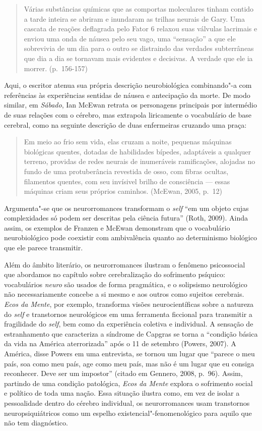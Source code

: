 \begin{quote}
Várias substâncias químicas que as comportas moleculares tinham contido
a tarde inteira se abriram e inundaram as trilhas neurais de Gary. Uma
cascata de reações deflagrada pelo Fator 6 relaxou suas válvulas
lacrimais e enviou uma onda de náusea pelo seu vago, uma ``sensação'' a
que ele sobrevivia de um dia para o outro se distraindo das verdades
subterrâneas que dia a dia se tornavam mais evidentes e decisivas. A
verdade que ele ia morrer. (p.~156-157)
\end{quote}

Aqui, o escritor atenua sua própria descrição neurobiológica
combinando"-a com referências às experiências sentidas de náusea e
antecipação da morte. De modo similar, em \emph{Sábado}, Ian McEwan
retrata os personagens principais por intermédio de suas relações com o
cérebro, mas extrapola liricamente o vocabulário de base cerebral, como
na seguinte descrição de duas enfermeiras cruzando uma praça:

\begin{quote}
Em meio ao frio sem vida, elas cruzam a noite, pequenas máquinas
biológicas quentes, dotadas de habilidades bípedes, adaptáveis a
qualquer terreno, providas de redes neurais de inumeráveis ramificações,
alojadas no fundo de uma protuberância revestida de osso, com fibras
ocultas, filamentos quentes, com seu invísivel brilho de consciência ---
essas máquinas criam seus próprios caminhos. (McEwan, 2005, p.~12)
\end{quote}

Argumenta"-se que os neurorromances transformam o \emph{self} ``em um objeto
cujas complexidades só podem ser descritas pela ciência futura'' (Roth,
2009). Ainda assim, os exemplos de Franzen e McEwan demonstram que o
vocabulário neurobiológico pode coexistir com ambivalência quanto ao
determinismo biológico que ele parece transmitir.

Além do âmbito literário, os neurorromances ilustram o fenômeno
psicossocial que abordamos no capítulo sobre cerebralização do
sofrimento psíquico: vocabulários \emph{neuro} são usados de forma
pragmática, e o solipsismo neurológico não necessariamente concebe a si
mesmo e aos outros como sujeitos cerebrais. \emph{Ecos da Mente}, por
exemplo, transforma visões neurocientíficas sobre a natureza do \emph{self} e
transtornos neurológicos em uma ferramenta ficcional para transmitir a
fragilidade do \emph{self}, bem como da experiência coletiva e individual. A
sensação de estranhamento que caracteriza a síndrome de Capgras se torna
a ``condição básica da vida na América aterrorizada'' após o 11 de
setembro (Powers, 2007). A América, disse Powers em uma entrevista, se
tornou um lugar que ``parece o meu país, soa como meu país, age como meu
país, mas não é um lugar que eu consiga reconhecer. Deve ser um
impostor'' (citado em Gennero, 2008, p.~96). Assim, partindo de uma
condição patológica, \emph{Ecos da Mente} explora o sofrimento social e
político de toda uma nação. Essa situação ilustra como, em vez de isolar
a pessoalidade dentro do cérebro individual, os neurorromances usam
transtornos neuropsiquiátricos como um espelho
existencial"-fenomenológico para aquilo que não tem diagnóstico.

